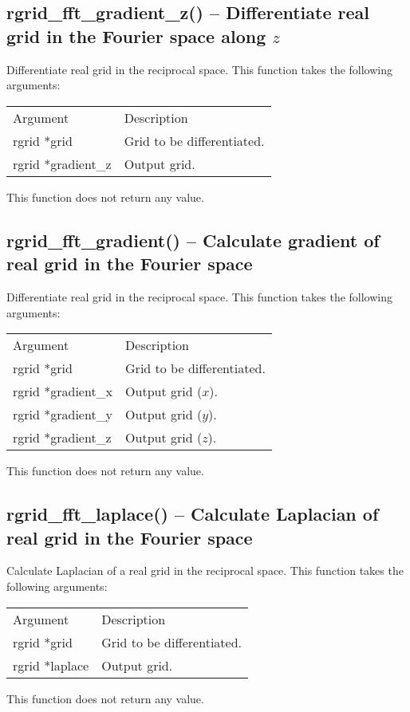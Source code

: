 \documentclass[12pt,letterpaper]{report}
\begin{document}
\subsection{rgrid\_fft\_gradient\_z() -- Differentiate real grid in the Fourier space along $z$}

Differentiate real grid in the reciprocal space. This function takes the following arguments:
\begin{longtable}{p{} p{}}
Argument & Description\\
\cline{1-2}
rgrid *grid & Grid to be differentiated.\\
rgrid *gradient\_z & Output grid.\\
\end{longtable}
\noindent
This function does not return any value.

\subsection{rgrid\_fft\_gradient() -- Calculate gradient of real grid in the Fourier space}

Differentiate real grid in the reciprocal space. This function takes the following arguments:
\begin{longtable}{p{} p{}}
Argument & Description\\
\cline{1-2}
rgrid *grid & Grid to be differentiated.\\
rgrid *gradient\_x & Output grid ($x$).\\
rgrid *gradient\_y & Output grid ($y$).\\
rgrid *gradient\_z & Output grid ($z$).\\
\end{longtable}
\noindent
This function does not return any value.

\subsection{rgrid\_fft\_laplace() -- Calculate Laplacian of real grid in the Fourier space}

Calculate Laplacian of a real grid in the reciprocal space. This function takes the following arguments:
\begin{longtable}{p{} p{}}
Argument & Description\\
\cline{1-2}
rgrid *grid & Grid to be differentiated.\\
rgrid *laplace & Output grid.\\
\end{longtable}
\noindent
This function does not return any value.
\end{document}

